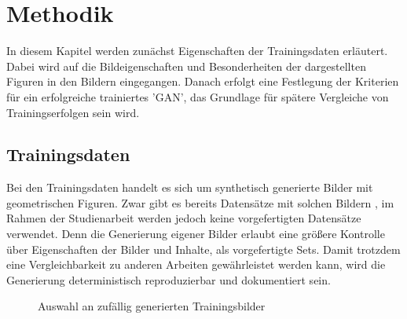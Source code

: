 
\chapter{Methodik}
In diesem Kapitel werden zunächst Eigenschaften der Trainingsdaten erläutert.
Dabei wird auf die Bildeigenschaften und Besonderheiten der dargestellten Figuren in den Bildern eingegangen.
Danach erfolgt eine Festlegung der Kriterien für ein erfolgreiche trainiertes 'GAN', das Grundlage für spätere Vergleiche von Trainingserfolgen sein wird.

\section{Trainingsdaten}
Bei den Trainingsdaten handelt es sich um synthetisch generierte Bilder mit geometrischen Figuren.
Zwar gibt es bereits Datensätze mit solchen Bildern \cite{dataset:four-shapes, dataset:2d-geometric-shapes-dataset}, im Rahmen der Studienarbeit werden jedoch keine vorgefertigten Datensätze verwendet.
Denn die Generierung eigener Bilder erlaubt eine größere Kontrolle über Eigenschaften der Bilder und Inhalte, als vorgefertigte Sets.
Damit trotzdem eine Vergleichbarkeit zu anderen Arbeiten gewährleistet werden kann, wird die Generierung deterministisch reproduzierbar und dokumentiert sein.

\newcommand{\trainDataImage}[1]{\subfloat{\fbox{\texttt{[image: \#1]}}}}
\begin{figure}
	\trainDataImage{kapitel/3\_methodik/data/circle\_00.png}\hfill
	\trainDataImage{kapitel/3\_methodik/data/circle\_01.png}\hfill
	\trainDataImage{kapitel/3\_methodik/data/circle\_02.png}\par \hfill
	
	\trainDataImage{kapitel/3\_methodik/data/rectangle\_00.png}\hfill
	\trainDataImage{kapitel/3\_methodik/data/rectangle\_01.png}\hfill
	\trainDataImage{kapitel/3\_methodik/data/rectangle\_02.png}\par \hfill
	
	\trainDataImage{kapitel/3\_methodik/data/triangle\_00.png}\hfill
	\trainDataImage{kapitel/3\_methodik/data/triangle\_01.png}\hfill
	\trainDataImage{kapitel/3\_methodik/data/triangle\_02.png}\par \hfill
	
	\caption{Auswahl an zufällig generierten Trainingsbilder}
\end{figure}

